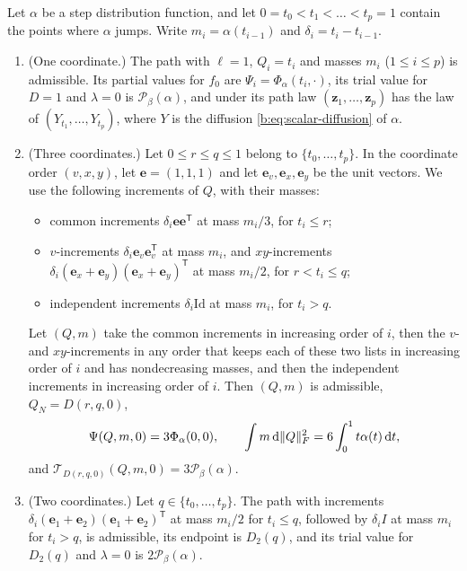 \begin{lemma}\label{lem:inp-blocks}
Let $\alpha$ be a step distribution function, and let $0=t_0<t_1<\dots<t_p=1$
contain the points where $\alpha$ jumps. Write $m_i=\alpha(t_{i-1})$ and
$\delta_i=t_i-t_{i-1}$.
\begin{enumerate}[label=\textup{(\alph*)}]
\item \textup{(One coordinate.)} The path with $\ell=1$, $Q_i=t_i$ and masses
 $m_i$ ($1\le i\le p$) is admissible. Its partial values for $f_0$ are
 $\Psi_i=\Phi_\alpha(t_i,\cdot)$, its trial value for $D=1$ and $\lambda=0$ is
 $\mathcal P_\beta(\alpha)$, and under its path law $(\mathbf z_1,\dots,\mathbf
 z_p)$ has the law of $(Y_{t_1},\dots,Y_{t_p})$, where $Y$ is the diffusion
 \eqref{b:eq:scalar-diffusion} of $\alpha$.
\item \textup{(Three coordinates.)} Let $0\le r\le q\le1$ belong to
 $\{t_0,\dots,t_p\}$. In the coordinate order $(v,x,y)$, let
 $\mathbf e=(1,1,1)$ and let $\mathbf e_v,\mathbf e_x,\mathbf e_y$ be the unit
 vectors. We use the following increments of $Q$, with their masses:
 \begin{itemize}
 \item common increments $\delta_i\mathbf e\mathbf e^{\mathsf T}$ at mass
  $m_i/3$, for $t_i\le r$;
 \item $v$-increments $\delta_i\mathbf e_v\mathbf e_v^{\mathsf T}$ at mass $m_i$,
  and $xy$-increments $\delta_i(\mathbf e_x+\mathbf e_y)(\mathbf e_x+\mathbf
  e_y)^{\mathsf T}$ at mass $m_i/2$, for $r<t_i\le q$;
 \item independent increments $\delta_i\mathrm{Id}$ at mass $m_i$, for $t_i>q$.
 \end{itemize}
 Let $(Q,m)$ take the common increments in increasing order of $i$, then the
 $v$- and $xy$-increments in any order that keeps each of these two lists in
 increasing order of $i$ and has nondecreasing masses, and then the
 independent increments in increasing order of $i$. Then $(Q,m)$ is admissible,
 $Q_N=D(r,q,0)$,
 \[
  \Psi(Q,m,0)=3\Phi_\alpha(0,0),\qquad
  \int m\,\mathrm d\lVert Q\rVert_F^2=6\int_0^1t\alpha(t)\,\mathrm d t,
 \]
 and $\mathcal T_{D(r,q,0)}(Q,m,0)=3\mathcal P_\beta(\alpha)$.
\item \textup{(Two coordinates.)} Let $q\in\{t_0,\dots,t_p\}$. The path with
 increments $\delta_i(\mathbf e_1+\mathbf e_2)(\mathbf e_1+\mathbf
 e_2)^{\mathsf T}$ at mass $m_i/2$ for $t_i\le q$, followed by $\delta_iI$ at
 mass $m_i$ for $t_i>q$, is admissible, its endpoint is $D_2(q)$, and its trial
 value for $D_2(q)$ and $\lambda=0$ is $2\mathcal P_\beta(\alpha)$.

\end{enumerate}
\end{lemma}
